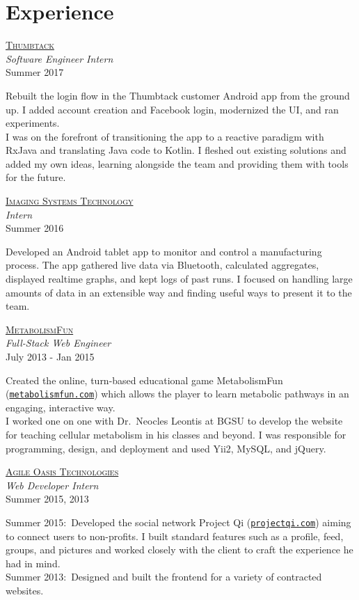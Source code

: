 \documentclass[letterpaper,10pt]{article}
\newcommand{\lb}{\vspace{4pt} \\}
\newenvironment{resumecols}[4]
{
    \vspace{.11cm}
    \begin{minipage}[t]{.21\linewidth}
        \begin{flushright}
            \href{#2}{\textsc{#1}} \\
            \small{\textit{#3}} \\
            \small{#4}
        \end{flushright}
    \end{minipage}
    \hspace{.005\linewidth}
    \begin{minipage}[t]{.77\linewidth}
}
{
    \end{minipage}
    \vspace{.11cm}
}
\begin{document}
\section{Experience}

\begin{resumecols}{Thumbtack}{https://www.thumbtack.com/about}{Software Engineer Intern}{Summer 2017}
    Rebuilt the login flow in the Thumbtack customer Android app from the ground up. I added account creation and Facebook login, modernized the UI, and ran experiments.
    \lb
    I was on the forefront of transitioning the app to a reactive paradigm with RxJava and translating Java code to Kotlin. I fleshed out existing solutions and added my own ideas, learning alongside the team and providing them with tools for the future.
\end{resumecols}

\begin{resumecols}{Imaging Systems Technology}{http://www.teamist.com}{Intern}{Summer 2016}
    Developed an Android tablet app to monitor and control a manufacturing process. The app gathered live data via Bluetooth, calculated aggregates, displayed realtime graphs, and kept logs of past runs. I focused on handling large amounts of data in an extensible way and finding useful ways to present it to the team.
\end{resumecols}

\begin{resumecols}{MetabolismFun}{http://metabolismfun.com}{Full-Stack Web Engineer}{July 2013 - Jan 2015}
    Created the online, turn-based educational game MetabolismFun (\href{http://metabolismfun.com}{\texttt{metabolismfun.com}}) which allows the player to learn metabolic pathways in an engaging, interactive way.
    \lb
    I worked one on one with Dr.\ Neocles Leontis at BGSU to develop the website for teaching cellular metabolism in his classes and beyond. I was responsible for programming, design, and deployment and used Yii2, MySQL, and jQuery.
\end{resumecols}

\begin{resumecols}{Agile Oasis Technologies}{http://agileoasis.com}{Web Developer Intern}{Summer 2015, 2013}
    Summer 2015:\ Developed the social network Project Qi (\href{http://www.projectqi.com}{\texttt{projectqi.com}}) aiming to connect users to non-profits. I built standard features such as a profile, feed, groups, and pictures and worked closely with the client to craft the experience he had in mind.
    \lb
    Summer 2013:\ Designed and built the frontend for a variety of contracted websites.
\end{resumecols}
\end{document}
